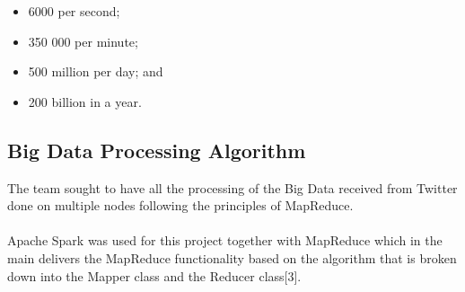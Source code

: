 \documentclass[12pt]{article} %
\begin{document}
		\begin{itemize}
			\item 6000 per second; 
			\item 350 000 per minute;
			\item 500 million per day; and
			\item 200 billion in a year.
		\end{itemize}
	
	\subsection {Big Data Processing Algorithm}
	
	The team sought to have all the processing of the Big Data received from Twitter done on multiple nodes following the principles of MapReduce.
	\\
	\\
	Apache Spark was used for this project together with MapReduce which in the main delivers the MapReduce functionality based on the algorithm that is broken down into the Mapper class and the Reducer class[3].

	
	
	
	
	
	
	
	
\end{document}
